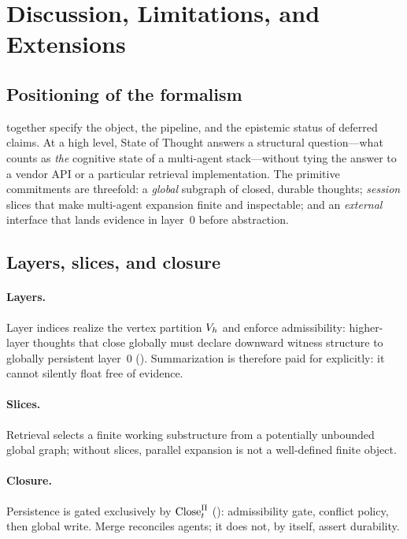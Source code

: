 \section{Discussion, Limitations, and Extensions}
\label{sec:discussion}

\subsection{Positioning of the formalism}
\label{subsec:disc-positioning}

 together specify the object, the pipeline, and the epistemic status of deferred claims.
At a high level, State of Thought answers a structural question---what counts as \emph{the} cognitive state of a multi-agent stack---without tying the answer to a vendor API or a particular retrieval implementation.
The primitive commitments are threefold: a \emph{global} subgraph of closed, durable thoughts; \emph{session} slices that make multi-agent expansion finite and inspectable; and an \emph{external} interface that lands evidence in layer~$0$ before abstraction.

\subsection{Layers, slices, and closure}
\label{subsec:disc-mechanisms}

\paragraph{Layers.}
Layer indices realize the vertex partition $V_{h}$ and enforce admissibility: higher-layer thoughts that close globally must declare downward witness structure to globally persistent layer~$0$ ().
Summarization is therefore paid for explicitly: it cannot silently float free of evidence.

\paragraph{Slices.}
Retrieval selects a finite working substructure from a potentially unbounded global graph; without slices, parallel expansion is not a well-defined finite object.

\paragraph{Closure.}
Persistence is gated exclusively by $\mathrm{Close}_t^{\Pi}$ (): admissibility gate, conflict policy, then global write.
Merge reconciles agents; it does not, by itself, assert durability.


